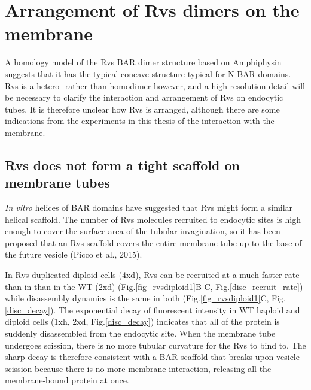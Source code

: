 


\section{Arrangement of Rvs dimers on the membrane}
A homology model of the Rvs BAR dimer structure based on Amphiphysin suggests that it has the typical concave structure typical for N-BAR domains. Rvs is a hetero- rather than homodimer however, and a high-resolution detail will be necessary to clarify the interaction and arrangement of Rvs on endocytic tubes. It is therefore unclear how Rvs is arranged, although there are some indications from the experiments in this thesis of the interaction with the membrane.



\subsection{Rvs does not form a tight scaffold on membrane tubes}
\textit{In vitro} helices of BAR domains have suggested that Rvs might form a similar helical scaffold. The number of Rvs molecules recruited to endocytic sites is high enough to cover the surface area of the tubular invagination, so it has been proposed that an Rvs scaffold covers the entire membrane tube up to the base of the future vesicle (Picco et al., 2015). 

	\vspace{5mm}
In Rvs duplicated diploid cells (4xd), Rvs can be recruited at a much faster rate than in than in the WT (2xd) (Fig.\ref{fig_rvsdiploid1}B-C, Fig.\ref{disc_recruit_rate}) while disassembly dynamics is the same in both (Fig.\ref{fig_rvsdiploid1}C, Fig.\ref{disc_decay}). The exponential decay of fluorescent intensity in WT haploid and diploid cells (1xh, 2xd, Fig.\ref{disc_decay}) indicates that all of the protein is suddenly disassembled from the endocytic site. When the membrane tube undergoes scission, there is no more tubular curvature for the Rvs to bind to. The sharp decay is therefore consistent with a BAR scaffold that breaks upon vesicle scission because there is no more membrane interaction, releasing all the membrane-bound protein at once. 



